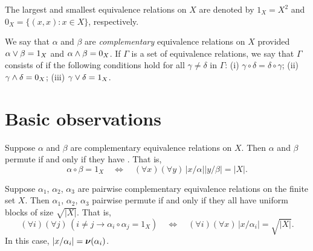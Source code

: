 The largest and smallest equivalence relations on $X$ are denoted by $1_X = X^2$
and $0_X = \{(x,x) : x \in X\}$, respectively.

We say that $\alpha$ and $\beta$ are \emph{complementary} equivalence relations
on $X$ provided $\alpha \vee \beta = 1_X$ and $\alpha \wedge \beta = 0_X$.
If $\Gamma$ is a set of equivalence relations, 
we say that $\Gamma$ consists of 
if the following conditions hold for all $\gamma \neq \delta$ in $\Gamma$:
(i) $\gamma \circ \delta = \delta \circ \gamma$;  
(ii) $\gamma \wedge \delta = 0_X$;  
(iii) $\gamma \vee \delta = 1_X$.

\section{Basic observations}
\begin{lemma}
\label{lem:1}
Suppose $\alpha$ and $\beta$ are complementary equivalence relations on
$X$. Then $\alpha$ and $\beta$ permute if and only if they have \cubs.
That is,
\[
\alpha \circ \beta =1_X \quad \Longleftrightarrow \quad (\forall x)(\forall y)\,
|x/\alpha| |y/\beta| = |X|.
\]
\end{lemma}
\begin{corollary}
\label{cor:1}
Suppose $\alpha_1$, $\alpha_2$, $\alpha_3$ are pairwise complementary
equivalence relations on the finite set $X$. 
Then  $\alpha_1$, $\alpha_2$, $\alpha_3$ pairwise permute if and only if they
all have uniform blocks of size $\sqrt{|X|}$.  That is,
\[
(\forall i)(\forall j) \, (i\neq j \longrightarrow \alpha_i \circ \alpha_j = 1_X)
\quad \Longleftrightarrow \quad (\forall i)(\forall x) \, |x/\alpha_i| =
\sqrt{|X|}.
\]
In this case,  $|x/\alpha_i| =\operatorname{\boldsymbol{\nu}}(\alpha_i)$. 
\end{corollary}
